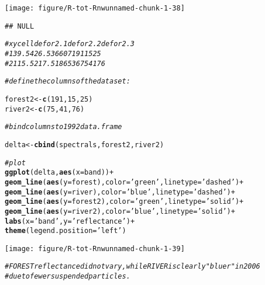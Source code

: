 \documentclass{article}\usepackage[]{graphicx}\usepackage[]{color}
\makeatletter
\newcommand{\hlnum}[1]{\textcolor[rgb]{0.686,0.059,0.569}{#1}}%
\newcommand{\hlstr}[1]{\textcolor[rgb]{0.192,0.494,0.8}{#1}}%
\newcommand{\hlcom}[1]{\textcolor[rgb]{0.678,0.584,0.686}{\textit{#1}}}%
\newcommand{\hlopt}[1]{\textcolor[rgb]{0,0,0}{#1}}%
\newcommand{\hlstd}[1]{\textcolor[rgb]{0.345,0.345,0.345}{#1}}%
\newcommand{\hlkwb}[1]{\textcolor[rgb]{0.69,0.353,0.396}{#1}}%
\newcommand{\hlkwc}[1]{\textcolor[rgb]{0.333,0.667,0.333}{#1}}%
\newcommand{\hlkwd}[1]{\textcolor[rgb]{0.737,0.353,0.396}{\textbf{#1}}}%
\newenvironment{kframe}{%
 \def\at@end@of@kframe{}%
 \ifinner\ifhmode%
  \def\at@end@of@kframe{\end{minipage}}%
  \begin{minipage}{\columnwidth}%
 \fi\fi%
 \def\FrameCommand##1{\hskip\@totalleftmargin \hskip-\fboxsep
 \colorbox{shadecolor}{##1}\hskip-\fboxsep
     \hskip-\linewidth \hskip-\@totalleftmargin \hskip\columnwidth}%
 \MakeFramed {\advance\hsize-\width
   \@totalleftmargin\z@ \linewidth\hsize
   \@setminipage}}%
 {\par\unskip\endMakeFramed%
 \at@end@of@kframe}
\newenvironment{knitrout}{}{} %
\makeatother
\begin{document}
\begin{knitrout}
{\centering \texttt{[image: figure/R-tot-Rnwunnamed-chunk-1-38]} 

}


\begin{kframe}\begin{verbatim}
## NULL
\end{verbatim}
\begin{alltt}
\hlcom{#       x     y   cell defor2.1 defor2.2 defor2.3}
\hlcom{# 1  39.5 426.5  36607      191       15       25}
\hlcom{# 2 115.5 217.5 186536       75       41       76}

\hlcom{# define the columns of the dataset:}

\hlstd{forest2} \hlkwb{<-} \hlkwd{c}\hlstd{(}\hlnum{191}\hlstd{,} \hlnum{15}\hlstd{,} \hlnum{25}\hlstd{)}
\hlstd{river2} \hlkwb{<-} \hlkwd{c}\hlstd{(}\hlnum{75}\hlstd{,} \hlnum{41}\hlstd{,} \hlnum{76}\hlstd{)}

\hlcom{# bind columns to 1992 data.frame}

\hlstd{delta} \hlkwb{<-} \hlkwd{cbind}\hlstd{(spectrals, forest2, river2)}

\hlcom{# plot}
\hlkwd{ggplot}\hlstd{(delta,} \hlkwd{aes}\hlstd{(}\hlkwc{x} \hlstd{= band))} \hlopt{+}
  \hlkwd{geom_line}\hlstd{(}\hlkwd{aes}\hlstd{(}\hlkwc{y} \hlstd{= forest),} \hlkwc{color} \hlstd{=} \hlstr{'green'}\hlstd{,} \hlkwc{linetype} \hlstd{=} \hlstr{'dashed'}\hlstd{)} \hlopt{+}
  \hlkwd{geom_line}\hlstd{(}\hlkwd{aes}\hlstd{(}\hlkwc{y} \hlstd{= river),} \hlkwc{color} \hlstd{=} \hlstr{'blue'}\hlstd{,} \hlkwc{linetype} \hlstd{=} \hlstr{'dashed'}\hlstd{)} \hlopt{+}
  \hlkwd{geom_line}\hlstd{(}\hlkwd{aes}\hlstd{(}\hlkwc{y} \hlstd{= forest2),} \hlkwc{color} \hlstd{=} \hlstr{'green'}\hlstd{,} \hlkwc{linetype} \hlstd{=} \hlstr{'solid'}\hlstd{)} \hlopt{+}
  \hlkwd{geom_line}\hlstd{(}\hlkwd{aes}\hlstd{(}\hlkwc{y} \hlstd{= river2),} \hlkwc{color} \hlstd{=} \hlstr{'blue'}\hlstd{,} \hlkwc{linetype} \hlstd{=} \hlstr{'solid'}\hlstd{)} \hlopt{+}
  \hlkwd{labs}\hlstd{(}\hlkwc{x} \hlstd{=} \hlstr{'band'}\hlstd{,} \hlkwc{y} \hlstd{=} \hlstr{'reflectance'}\hlstd{)} \hlopt{+}
  \hlkwd{theme}\hlstd{(}\hlkwc{legend.position} \hlstd{=} \hlstr{'left'}\hlstd{)}
\end{alltt}
\end{kframe}

{\centering \texttt{[image: figure/R-tot-Rnwunnamed-chunk-1-39]} 

}


\begin{kframe}\begin{alltt}
\hlcom{# FOREST reflectance did not vary, while RIVER is clearly "bluer" in 2006}
\hlcom{# due to fewer suspended particles.}


\end{alltt}
\end{kframe}
\end{knitrout}
\end{document}
